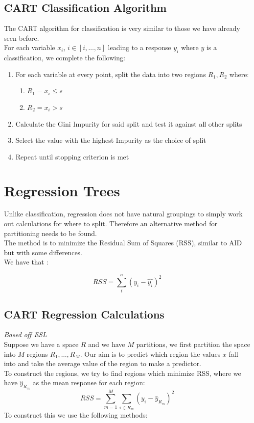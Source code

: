\documentclass[11pt,a4paper]{report}
\begin{document}
\subsection{CART Classification Algorithm}
The CART algorithm for classification is very similar to those we have already seen before. \\
For each variable $x_i$, $i \in [i, \dots, n]$ leading to a response $y_i$ where $y$ is a classification, we complete the following:
\begin{enumerate}
    \item For each variable at every point, split the data into two regions $R_1, R_2$ where:
    \begin{enumerate}
        \item $R_1 = x_i \leq s$
        \item $R_2 = x_i > s$
    \end{enumerate}
    
    \item Calculate the Gini Impurity for said split and test it against all other splits
    
    \item Select the value with the highest Impurity as the choice of split
    
    \item Repeat until stopping criterion is met
\end{enumerate}




\section{Regression Trees}
Unlike classification, regression does not have natural groupings to simply work out calculations for where to split. 
Therefore an alternative method for partitioning needs to be found.\\
The method is to minimize the Residual Sum of Squares (RSS), similar to AID but with some differences.\\ 
We have that \cite[Section 3, p. 44-46]{ESL}:

\begin{equation}
  RSS = \sum_{i}^{n}(y_i -\hat{y_i})^2  
\end{equation}

\subsection{CART Regression Calculations}
\emph{Based off ESL \cite[Section 9, p. 307]{ESL}}\\
Suppose we have a space $R$ and we have $M$ partitions, we first partition the space into $M$ regions $R_1, \dots, R_M$.
Our aim is to predict which region the values $x$ fall into and take the average value of the region to make a predictor.\\
To construct the regions, we try to find regions which minimize RSS, where we have $\hat{y}_{R_m}$ as the mean response for each region:
\begin{equation}
    RSS = \sum_{m=1}^{M} \sum_{i \in R_m} (y_i - \hat{y}_{R_m})^2
\end{equation}
To construct this we use the following methods:
\end{document}
